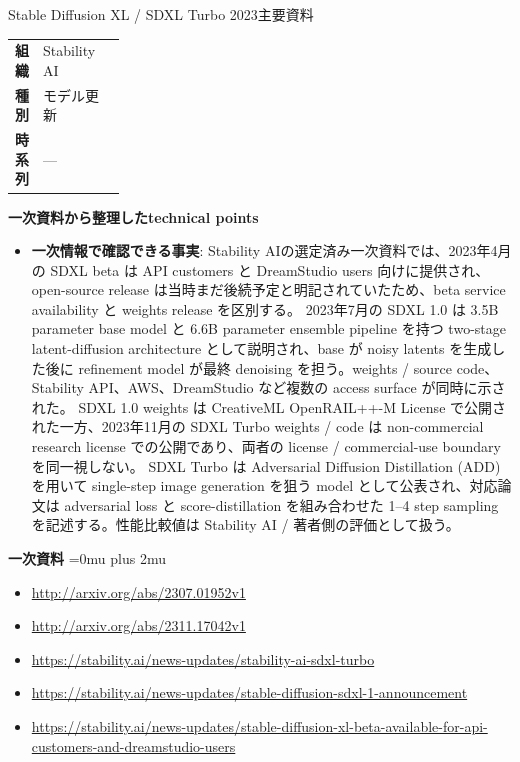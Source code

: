 \begin{technicalnote}{Stable Diffusion XL / SDXL Turbo 2023}{主要資料}
\begingroup
\begin{tabularx}{\linewidth}{@{}>{\bfseries}p{0.22\linewidth}X@{}}
組織 & Stability AI \\
種別 & モデル更新 \\
時系列 & — \\
\end{tabularx}
\smallskip
{\bfseries 一次資料から整理したtechnical points}
\begin{itemize}[leftmargin=1.5em,itemsep=0.35em]
\item \textbf{一次情報で確認できる事実}: Stability AIの選定済み一次資料では、2023年4月の SDXL beta は API customers と DreamStudio users 向けに提供され、open-source release は当時まだ後続予定と明記されていたため、beta service availability と weights release を区別する。 2023年7月の SDXL 1.0 は 3.5B parameter base model と 6.6B parameter ensemble pipeline を持つ two-stage latent-diffusion architecture として説明され、base が noisy latents を生成した後に refinement model が最終 denoising を担う。weights / source code、Stability API、AWS、DreamStudio など複数の access surface が同時に示された。 SDXL 1.0 weights は CreativeML OpenRAIL++-M License で公開された一方、2023年11月の SDXL Turbo weights / code は non-commercial research license での公開であり、両者の license / commercial-use boundary を同一視しない。 SDXL Turbo は Adversarial Diffusion Distillation (ADD) を用いて single-step image generation を狙う model として公表され、対応論文は adversarial loss と score-distillation を組み合わせた 1--4 step sampling を記述する。性能比較値は Stability AI / 著者側の評価として扱う。
\end{itemize}
\begin{minipage}{\linewidth}
\begin{samepage}
{\bfseries 一次資料}
\begingroup\sloppy
\Urlmuskip=0mu plus 2mu\relax
\begin{itemize}[leftmargin=1.5em,itemsep=0.25em]
\item {\scriptsize\url{http://arxiv.org/abs/2307.01952v1}}
\item {\scriptsize\url{http://arxiv.org/abs/2311.17042v1}}
\item {\scriptsize\url{https://stability.ai/news-updates/stability-ai-sdxl-turbo}}
\item {\scriptsize\url{https://stability.ai/news-updates/stable-diffusion-sdxl-1-announcement}}
\item {\scriptsize\url{https://stability.ai/news-updates/stable-diffusion-xl-beta-available-for-api-customers-and-dreamstudio-users}}
\end{itemize}
\endgroup
\end{samepage}
\end{minipage}
\endgroup
\end{technicalnote}
\medskip

